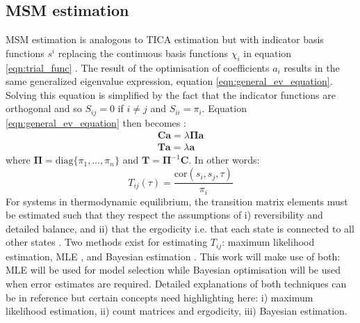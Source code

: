 \subsection{MSM estimation}
MSM estimation is analogous to TICA estimation but with  indicator basis functions $s^{i}$ replacing the continuous basis functions $\chi_{i}$ in equation \ref{eqn:trial_func} \cite{nuskeVariationalApproachMolecular2014}. The result of the optimisation of coefficients $a_{i}$ results in the same generalized eigenvalue expression, equation \ref{eqn:general_ev_equation}. Solving this equation is simplified by the fact that the indicator functions are orthogonal and so $S_{ij} = 0$ if $i \neq j$ and $S_{ii} = \pi_{i}$. Equation \ref{eqn:general_ev_equation} then becomes \cite{nuskeVariationalApproachMolecular2014,prinzMarkovModelsMolecular2011}:
\begin{align}\label{eqn:tran_def}
 \mathbf{C a}=\lambda \bm{\Pi} \mathbf{a} \\
\mathbf{T a}=\lambda \mathbf{a}   
\end{align}
where $\bm{\Pi} = \mathrm{diag}\{\pi_{1}, \ldots, \pi_{n}\}$ and $\mathbf{T} = \bm{\Pi}^{-1}\mathbf{C}$. In other words: 
\begin{equation}\label{eqn:tran_mat_def}
    T_{ij}(\tau) =\frac{\mathrm{cor}(s_{i}, s_{j}, \tau)}{\pi_{i}}
\end{equation}
For systems in thermodynamic equilibrium, the transition matrix elements must be estimated such that they respect the assumptions of i) reversibility and detailed balance, and ii) that the ergodicity i.e. that each state is connected to all other states \cite{nuskeVariationalApproachMolecular2014,prinzMarkovModelsMolecular2011}. Two methods exist for estimating $T_{ij}$: maximum likelihood estimation, MLE \cite{prinzMarkovModelsMolecular2011,bowmanProgressChallengesAutomated2009b}, and Bayesian estimation \cite{trendelkamp-schroerEstimationUncertaintyReversible2015b}. This work will make use of both: MLE will be used for model selection while Bayesian optimisation will be used when error estimates are required.  Detailed explanations of both  techniques can be in reference \cite{trendelkamp-schroerEstimationUncertaintyReversible2015b} but certain concepts need highlighting here: i) maximum likelihood estimation, ii) count matrices and ergodicity, iii) Bayesian estimation. 

